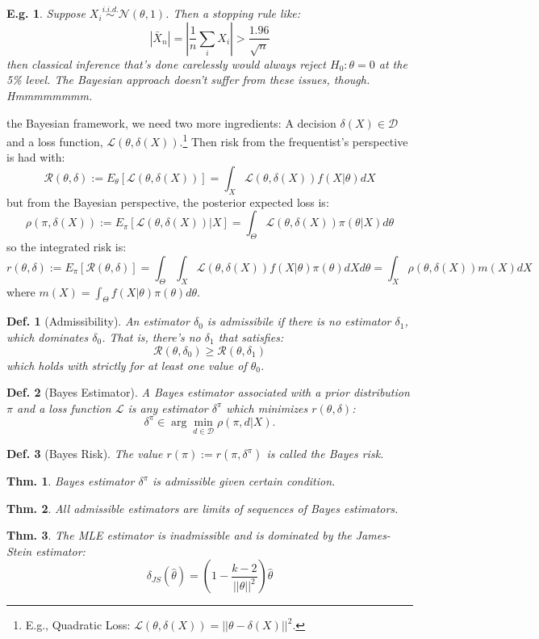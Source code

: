 \documentclass{tufte-book}
\theoremstyle{mytheoremstyle}
\newtheorem*{thm}{Thm.}
\theoremstyle{mylemstyle}
\theoremstyle{mydefstyle}
\newtheorem*{mydef}{Def.}
\newtheorem*{ex}{E.g.}
\begin{document}
\begin{ex} Suppose \(X_i \overset{i.i.d.}{\sim} \mathcal{N}(\theta, 1)\). Then a stopping rule like:
	\[|\bar{X}_n| = \left | \frac{1}{n} \sum_i X_i \right | > \frac{1.96}{\sqrt{n}}\]
then classical inference that's done carelessly would always reject \(H_0: \theta = 0\) at the 5\% level. The Bayesian approach doesn't suffer from these issues, though. Hmmmmmmmm. 
\end{ex}

 the Bayesian framework, we need two more ingredients: A decision \(\delta(X) \in \mathcal{D}\) and a loss function, \(\mathcal{L}(\theta, \delta(X))\).\footnote{E.g., Quadratic Loss: \(\mathcal{L}(\theta, \delta(X)) = ||\theta - \delta(X)||^2\).} Then risk from the frequentist's perspective is had with:
	\[\mathcal{R}(\theta, \delta) := E_\theta [\mathcal{L}(\theta, \delta(X))] = \int_X \mathcal{L}(\theta, \delta(X)) f(X|\theta)dX\]
but from the Bayesian perspective, the posterior expected loss is:
	\[\rho(\pi, \delta(X)) := E_\pi [\mathcal{L}(\theta, \delta(X))| X] = \int_\Theta \mathcal{L}(\theta, \delta(X)) \pi(\theta|X)d\theta\]
so the integrated risk is:
	\[r(\theta, \delta) := E_\pi [\mathcal{R}(\theta, \delta)] = \int_\Theta \int_X \mathcal{L}(\theta, \delta(X)) f(X| \theta) \pi(\theta) dX d\theta = \int_X \rho(\theta, \delta(X))m(X)dX\]
where \(m(X) = \int_\Theta f(X|\theta) \pi(\theta) d\theta\). 
\begin{mydef}[Admissibility] An estimator \(\delta_0\) is \emph{admissibile} if there is no estimator \(\delta_1\), which dominates \(\delta_0\). That is, there's no \(\delta_1\) that satisfies:
	\[\mathcal{R}(\theta, \delta_0) \ge \mathcal{R}(\theta, \delta_1)\]
which holds with strictly for at least one value of \(\theta_0\). 
\end{mydef}
\begin{mydef}[Bayes Estimator] A Bayes estimator associated with a prior distribution \(\pi\) and a loss function \(\mathcal{L}\) is any estimator \(\delta^\pi\) which minimizes \(r(\theta, \delta)\):
	\[\delta^\pi \in \arg \min_{d \in \mathcal{D}} \rho (\pi, d | X) \text{.}\]
\end{mydef}
\begin{mydef}[Bayes Risk] The value \(r(\pi) := r(\pi, \delta^\pi)\) is called the Bayes risk. 
\end{mydef}
\begin{thm} Bayes estimator \(\delta^\pi\) is admissible given certain condition.
\end{thm}
\begin{thm} All admissible estimators are limits of sequences of Bayes estimators.
\end{thm}
\begin{thm} The MLE estimator is inadmissible and is dominated by the James-Stein estimator:
	\[\delta_{JS}(\hat{\theta}) = \left(1 - \frac{k-2}{||\hat{\theta}||^2} \right)\hat{\theta}\]
\end{thm}
\end{document}
